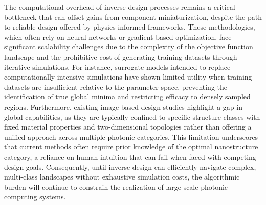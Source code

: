 The computational overhead of inverse design processes remains a critical bottleneck that can offset gains from component miniaturization, despite the path to reliable design offered by physics-informed frameworks. These methodologies, which often rely on neural networks or gradient-based optimization, face significant scalability challenges due to the complexity of the objective function landscape and the prohibitive cost of generating training datasets through iterative simulations. For instance, surrogate models intended to replace computationally intensive simulations have shown limited utility when training datasets are insufficient relative to the parameter space, preventing the identification of true global minima and restricting efficacy to densely sampled regions. Furthermore, existing image-based design studies highlight a gap in global capabilities, as they are typically confined to specific structure classes with fixed material properties and two-dimensional topologies rather than offering a unified approach across multiple photonic categories. This limitation underscores that current methods often require prior knowledge of the optimal nanostructure category, a reliance on human intuition that can fail when faced with competing design goals. Consequently, until inverse design can efficiently navigate complex, multi-class landscapes without exhaustive simulation costs, the algorithmic burden will continue to constrain the realization of large-scale photonic computing systems. \citep{doi_10_1109_cleo_europe_eqec65582_2025_11110329_26a41a7d} \citep{doi_10_1002_adom_202100548_6789fa4c}

